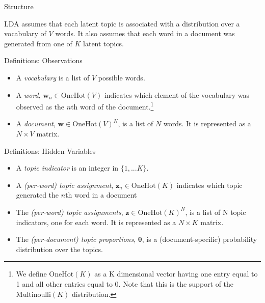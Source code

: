 \documentclass[10pt]{beamer}
\newcommand{\+}[1]{\ensuremath{{\boldsymbol #1}}} %
\begin{document}
\begin{frame}{Structure}

LDA assumes that each latent topic is associated with a distribution over a vocabulary of $V$ words.   It also assumes that each word in a document was generated from one of $K$ latent topics.
\end{frame}


\begin{frame}{Definitions: Observations}

\begin{itemize}
\item A \textit{vocabulary} is a list of $V$ possible words. 

\item A \textit{word}, $\+w_n \in \text{OneHot}(V)$ indicates which element of the vocabulary was observed as the $n$th word of the document.\footnote{\tiny We define $\text{OneHot}(K)$ as a K dimensional vector having one entry equal to  1 and all other entries equal to 0.   Note that this is the support of the $\text{Multinoulli}(K)$ distribution.} 
\item A \textit{document}, $\+w \in \text{OneHot}(V)^N$, is a list of $N$ words. It is represented as a $N \times V$ matrix. %

\end{itemize}
\end{frame}


\begin{frame}{Definitions: Hidden Variables}

\begin{itemize}
\item A \textit{topic indicator} is an integer in $\{1,...K\}$.
 

\item A \textit{(per-word) topic assignment}, $\+z_n \in \text{OneHot}(K)$ indicates which topic generated the $n$th word in a document
 
\item The \textit{(per-word) topic assignments}, $\+z \in \text{OneHot}(K)^{N}$, is a list of N topic indicators, one for each word.  It is represented as a $N \times K$ matrix. %

\item The \textit{(per-document) topic proportions}, $\+\theta$, is a (document-specific) probability distribution over the topics. 
\end{itemize}


\end{frame}
\end{document}
